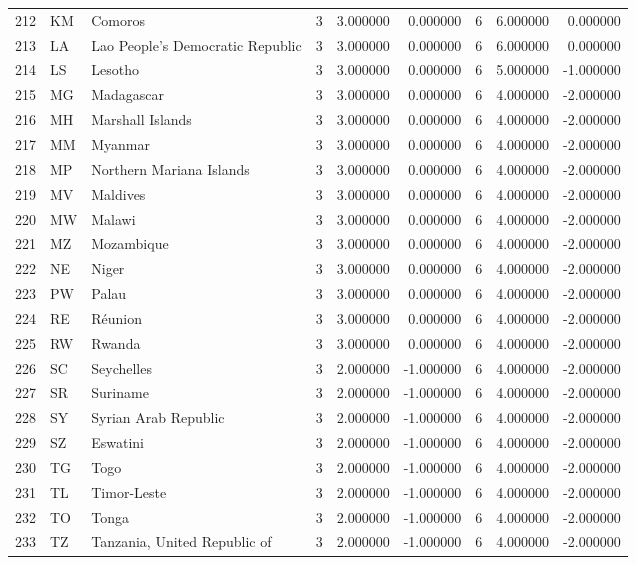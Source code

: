\begin{tabular}{lllrrrrrr}
212 & KM & Comoros & 3 & 3.000000 & 0.000000 & 6 & 6.000000 & 0.000000 \\
213 & LA & Lao People's Democratic Republic & 3 & 3.000000 & 0.000000 & 6 & 6.000000 & 0.000000 \\
214 & LS & Lesotho & 3 & 3.000000 & 0.000000 & 6 & 5.000000 & -1.000000 \\
215 & MG & Madagascar & 3 & 3.000000 & 0.000000 & 6 & 4.000000 & -2.000000 \\
216 & MH & Marshall Islands & 3 & 3.000000 & 0.000000 & 6 & 4.000000 & -2.000000 \\
217 & MM & Myanmar & 3 & 3.000000 & 0.000000 & 6 & 4.000000 & -2.000000 \\
218 & MP & Northern Mariana Islands & 3 & 3.000000 & 0.000000 & 6 & 4.000000 & -2.000000 \\
219 & MV & Maldives & 3 & 3.000000 & 0.000000 & 6 & 4.000000 & -2.000000 \\
220 & MW & Malawi & 3 & 3.000000 & 0.000000 & 6 & 4.000000 & -2.000000 \\
221 & MZ & Mozambique & 3 & 3.000000 & 0.000000 & 6 & 4.000000 & -2.000000 \\
222 & NE & Niger & 3 & 3.000000 & 0.000000 & 6 & 4.000000 & -2.000000 \\
223 & PW & Palau & 3 & 3.000000 & 0.000000 & 6 & 4.000000 & -2.000000 \\
224 & RE & Réunion & 3 & 3.000000 & 0.000000 & 6 & 4.000000 & -2.000000 \\
225 & RW & Rwanda & 3 & 3.000000 & 0.000000 & 6 & 4.000000 & -2.000000 \\
226 & SC & Seychelles & 3 & 2.000000 & -1.000000 & 6 & 4.000000 & -2.000000 \\
227 & SR & Suriname & 3 & 2.000000 & -1.000000 & 6 & 4.000000 & -2.000000 \\
228 & SY & Syrian Arab Republic & 3 & 2.000000 & -1.000000 & 6 & 4.000000 & -2.000000 \\
229 & SZ & Eswatini & 3 & 2.000000 & -1.000000 & 6 & 4.000000 & -2.000000 \\
230 & TG & Togo & 3 & 2.000000 & -1.000000 & 6 & 4.000000 & -2.000000 \\
231 & TL & Timor-Leste & 3 & 2.000000 & -1.000000 & 6 & 4.000000 & -2.000000 \\
232 & TO & Tonga & 3 & 2.000000 & -1.000000 & 6 & 4.000000 & -2.000000 \\
233 & TZ & Tanzania, United Republic of & 3 & 2.000000 & -1.000000 & 6 & 4.000000 & -2.000000 \\

\end{tabular}
